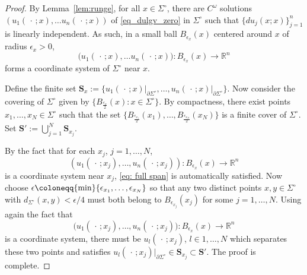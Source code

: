 \documentclass[11pt]{amsart}
\theoremstyle{definition}
\numberwithin{equation}{section}
\newcommand{\SSS}{\mathbf S}
\newcommand{\ccdot}{\,\cdot\,}
\begin{document}
\begin{proof}
By Lemma~\ref{lem:runge}, for all $x\in \Sigma^\circ$, there are $C^\omega$ solutions $(u_1(\ccdot; x), \dots u_n(\ccdot;x))$ of \eqref{eq_dulgv_zero} in $\Sigma^\circ$ such that $\{du_j(x;x)\}_{j=1}^n$ is linearly independent. As such, in a small ball $B_{\epsilon_x}(x)$ centered around $x$ of radius $\epsilon_x>0$, 
$$\big(u_1(\ccdot; x), \dots u_n(\ccdot;x)\big): B_{\epsilon_x}(x) \to \mathbb R^n$$
forms a coordinate system  of $\Sigma^\circ$ near $x$. %

Define the finite set $\SSS_x := \{u_1(\ccdot; x)\vert_{\partial \Sigma^\circ}, \dots, u_n(\ccdot;x)\vert_{\partial \Sigma^\circ}\}$. Now consider the covering of $\Sigma^\circ$ given by $\{B_{\frac{\epsilon_x}{2}}(x)\colon x\in \Sigma^\circ\}$. By compactness, there exist points $x_1,\dots, x_N\in \Sigma^\circ$ such that the set $\{B_{\frac{\epsilon_{x_1}}{2}}(x_1),\dots, B_{\frac{\epsilon_{x_N}}{2}}(x_N)\}$ is a finite cover of $\Sigma^\circ$. Set $\SSS' := \bigcup\limits_{j = 1}^N \SSS_{x_j}$.

By the fact that for each $x_j$, $j=1,\dots, N$, $$(u_1(\ccdot; x_j), \dots, u_n(\ccdot;x_j)): B_{\epsilon_x}(x) \to \mathbb R^n$$
is a coordinate system near $x_j$, \eqref{eq: full span} is automatically satisfied. Now choose $\epsilon \coloneqq {\rm min}\{\epsilon_{x_1},\dots, \epsilon_{x_N}\}$ so that any two distinct points $x,y\in\Sigma^\circ$ with $d_{\Sigma^\circ}(x,y)<\epsilon/4$ must both belong to $B_{\epsilon_{x_j}}(x_j)$ for some $j=1,\dots, N$. Using again the fact that 
$$\big(u_1(\ccdot; x_j), \dots, u_n(\ccdot;x_j)\big): B_{\epsilon_x}(x) \to \mathbb R^n$$
is a coordinate system, there must be $u_l(\ccdot; x_j)$, $l\in 1,\dots, N$ which separates these two points and satisfies $u_l(\ccdot; x_j)\vert_{\partial\Sigma^\circ} \in \SSS_{x_j}\subset \SSS'$. The proof is complete.
\end{proof}
\end{document}

